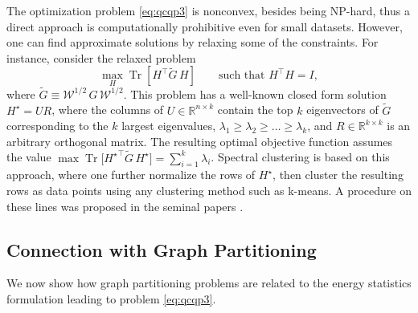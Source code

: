 \documentclass[10pt,journal,compsoc]{IEEEtran}
\DeclareMathOperator{\Tr}{Tr}
\begin{document}
The optimization problem \eqref{eq:qcqp3} is nonconvex, besides
being NP-hard, thus a direct approach 
is computationally prohibitive even for small datasets.
However, one can find approximate solutions by relaxing some 
of the constraints. For instance, consider the relaxed problem
\begin{equation}
\label{eq:relaxed}
\max_{H} \Tr \left[ H^\top \widetilde{G} \, H \right] 
\qquad \mbox{such that $H^\top H = I$},
\end{equation}
where $\widetilde{G} \equiv \mathcal{W}^{1/2} \, G \, \mathcal{W}^{1/2}$.
This problem has a well-known closed form solution $H^\star = U R$, where the
columns of $U \in \mathbb{R}^{n\times k}$ 
contain the top $k$ eigenvectors of $\widetilde{G}$ corresponding
to the $k$ largest eigenvalues, $\lambda_1\ge \lambda_2\ge\dotsc\ge\lambda_k$, 
and $R \in \mathbb{R}^{k\times k}$ is an arbitrary orthogonal matrix. 
The resulting optimal objective function assumes the value 
$\max \Tr \big[ {H^\star}^\top \widetilde{G} \, H^\star \big]  = 
\sum_{i=1}^k \lambda_i$. 
Spectral clustering is based on this approach, where
one further normalize the rows of $H^\star$, then cluster
the resulting rows as data points using any clustering method such
as k-means.
A procedure on these lines was proposed in the seminal papers
\cite{Malik,NgJordan}.


\subsection{Connection with Graph Partitioning}

We now show how
graph partitioning problems are related to the energy statistics
formulation leading to problem \eqref{eq:qcqp3}.
\end{document}
